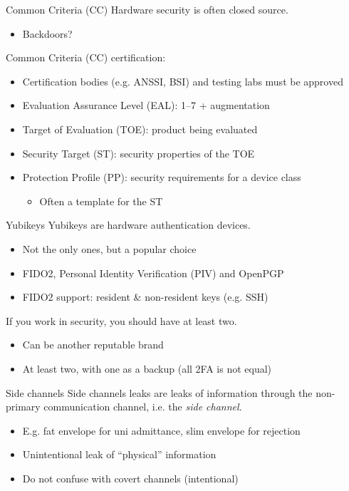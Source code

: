 \begin{frame}{Common Criteria (CC)}
  Hardware security is often closed source.
  \begin{itemize}[<+(1)->]
    \item Backdoors?
  \end{itemize}

  \vspace*{1em}

  \pause
  Common Criteria (CC) certification:
  \begin{itemize}[<+(1)->]
    \item Certification bodies (e.g. ANSSI, BSI) and testing labs must be approved
    \item Evaluation Assurance Level (EAL): 1--7 + augmentation
    \item Target of Evaluation (TOE): product being evaluated
    \item Security Target (ST): security properties of the TOE
    \item Protection Profile (PP): security requirements for a device class
    \begin{itemize}
      \item Often a template for the ST
    \end{itemize}
  \end{itemize}
\end{frame}

\begin{frame}{Yubikeys}
  Yubikeys are hardware authentication devices.
  \begin{itemize}[<+(1)->]
    \item Not the only ones, but a popular choice
    \item FIDO2, Personal Identity Verification (PIV) and OpenPGP
    \item FIDO2 support: resident \& non-resident keys (e.g. SSH)
  \end{itemize}

  \vspace*{1em}

  \pause
  If you work in security, you should have at least two.
  \begin{itemize}[<+(1)->]
    \item Can be another reputable brand
    \item At least two, with one as a backup (all 2FA is not equal)
  \end{itemize}
\end{frame}

\begin{frame}{Side channels}
  Side channels leaks are leaks of information through the non-primary communication channel, i.e. the \emph{side channel}.
  \begin{itemize}[<+(1)->]
    \item E.g. fat envelope for uni admittance, slim envelope for rejection
    \item Unintentional leak of \enquote{physical} information
    \item Do not confuse with covert channels (intentional)
  \end{itemize}
\end{frame}

